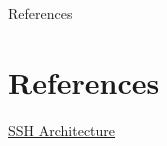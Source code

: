 \documentclass{beamer}
\begin{document}
\begin{frame}{References}
\section{References}

\begin{thebibliography}{10}


\href{https://docstore.mik.ua/orelly/networking_2ndEd/ssh/ch01_01.htm}{SSH Architecture}




\end{thebibliography}
\end{frame}
\end{document}
